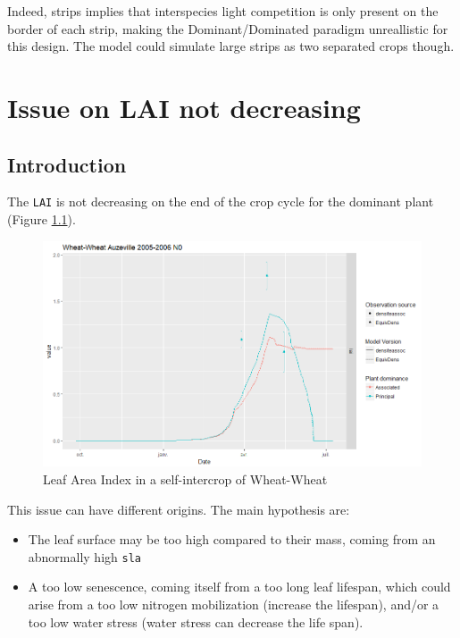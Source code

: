 \documentclass[]{book}
\providecommand{\tightlist}{%
  \setlength{\itemsep}{0pt}\setlength{\parskip}{0pt}}
\begin{document}
Indeed, strips implies that interspecies light competition is only present on the border of each strip, making the Dominant/Dominated paradigm unreallistic for this design. The model could simulate large strips as two separated crops though.

\hypertarget{LAIissue}{%
\chapter{Issue on LAI not decreasing}\label{LAIissue}}

\hypertarget{introduction-5}{%
\section{Introduction}\label{introduction-5}}

The \texttt{LAI} is not decreasing on the end of the crop cycle for the dominant plant (Figure \ref{fig:LAIhigh}).

\begin{figure}
\centering
\includegraphics{img/LAI_high.png}
\caption{\label{fig:LAIhigh}Leaf Area Index in a self-intercrop of Wheat-Wheat}
\end{figure}

This issue can have different origins. The main hypothesis are:

\begin{itemize}
\tightlist
\item
  The leaf surface may be too high compared to their mass, coming from an abnormally high \texttt{sla}\\
\item
  A too low senescence, coming itself from a too long leaf lifespan, which could arise from a too low nitrogen mobilization (increase the lifespan), and/or a too low water stress (water stress can decrease the life span).
\end{itemize}
\end{document}
